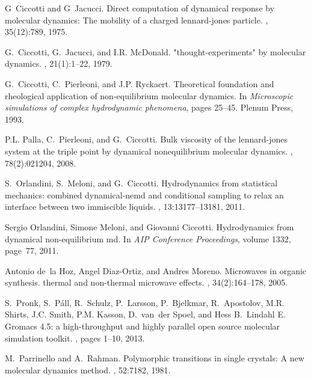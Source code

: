 \documentclass[a4paper,preprint,unsortedaddress,onecolumn]{revtex4-1}
\begin{document}
\begin{thebibliography}{10}
G~Ciccotti and G~Jacucci.
\newblock Direct computation of dynamical response by molecular dynamics: The
  mobility of a charged lennard-jones particle.
, 35(12):789, 1975.

G.~Ciccotti, G.~Jacucci, and I.R. McDonald.
\newblock "thought-experiments" by molecular dynamics.
, 21(1):1--22, 1979.

G.~Ciccotti, C.~Pierleoni, and J.P. Ryckaert.
\newblock Theoretical foundation and rheological application of non-equilibrium
  molecular dynamics.
\newblock In {\em Microscopic simulations of complex hydrodynamic phenomena},
  pages 25--45. Plenum Press, 1993.

P.L. Palla, C.~Pierleoni, and G.~Ciccotti.
\newblock Bulk viscosity of the lennard-jones system at the triple point by
  dynamical nonequilibrium molecular dynamics.
, 78(2):021204, 2008.

S.~Orlandini, S.~Meloni, and G.~Ciccotti.
\newblock Hydrodynamics from statistical mechanics: combined dynamical-nemd and
  conditional sampling to relax an interface between two immiscible liquids.
, 13:13177--13181, 2011.

Sergio Orlandini, Simone Meloni, and Giovanni Ciccotti.
\newblock Hydrodynamics from dynamical non-equilibrium md.
\newblock In {\em AIP Conference Proceedings}, volume 1332, page~77, 2011.

Antonio de~la Hoz, Angel Diaz-Ortiz, and Andres Moreno.
\newblock Microwaves in organic synthesis. thermal and non-thermal microwave
  effects.
, 34(2):164--178, 2005.

S.~Pronk, S.~P{\'a}ll, R.~Schulz, P.~Larsson, P.~Bjelkmar, R.~Apostolov, M.R.
  Shirts, J.C. Smith, P.M. Kasson, D.~van~der Spoel, and Hess B.~Lindahl E.
\newblock Gromacs 4.5: a high-throughput and highly parallel open source
  molecular simulation toolkit.
, pages 1--10, 2013.

M.~Parrinello and A.~Rahman.
\newblock Polymorphic transitions in single crystals: A new molecular dynamics
  method.
, 52:7182, 1981.


\end{thebibliography}
\end{document}

